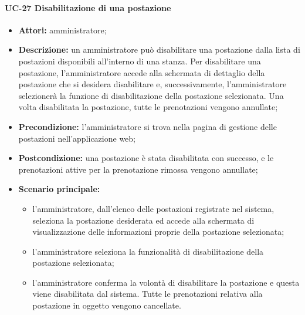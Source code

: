 \paragraph{UC-27 Disabilitazione di una postazione}
\begin{itemize}
    \item \textbf{Attori:} amministratore;
    \item \textbf{Descrizione:} un amministratore pu\`{o} disabilitare una postazione dalla lista di postazioni disponibili all'interno di una stanza. Per disabilitare una postazione, l'amministratore accede alla schermata di dettaglio della postazione che si desidera disabilitare e, successivamente, l'amministratore selezionerà la funzione di disabilitazione della postazione selezionata. Una volta disabilitata la postazione, tutte le prenotazioni vengono annullate;
    \item \textbf{Precondizione:} l'amministratore si trova nella pagina di gestione delle postazioni nell'applicazione web;
    \item \textbf{Postcondizione:} una postazione \`{e} stata disabilitata con successo, e le prenotazioni attive per la prenotazione rimossa vengono annullate;
    \item \textbf{Scenario principale:}
    \begin{itemize}
        \item l'amministratore, dall'elenco delle postazioni registrate nel sistema, seleziona la postazione desiderata ed accede alla schermata di visualizzazione delle informazioni proprie della postazione selezionata;
        \item l'amministratore seleziona la funzionalità di disabilitazione della postazione selezionata;
        \item l'amministratore conferma la volontà di disabilitare la postazione e questa viene disabilitata dal sistema. Tutte le prenotazioni relativa alla postazione in oggetto vengono cancellate.
    \end{itemize}
\end{itemize}

